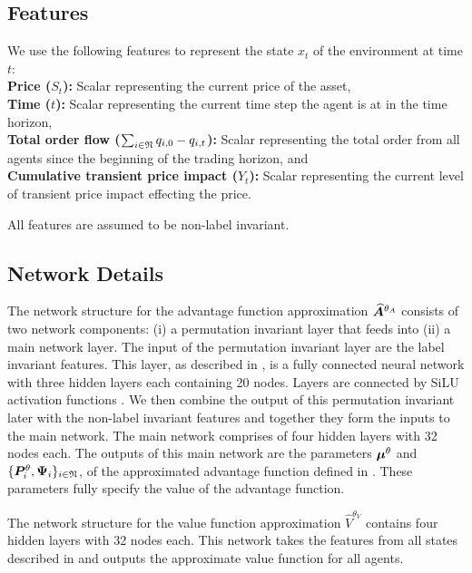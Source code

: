 \documentclass[onefignum,onetabnum]{siamonline171218}
\begin{document}
\subsection{Features}
\label{sec:features}
We use the following features to represent the state $x_t$ of the environment at time $t$:\\
\textbf{Price ($S_t$): } Scalar representing the current price of the asset, \\
\textbf{Time ($t$): } Scalar representing the current time step the agent is at in the time horizon, \\
\textbf{Total order flow ($\sum_{i \in {\mathfrak{N}}} q_{i,0} - q_{i,t} $): } Scalar representing the total order from all agents since the beginning of the trading horizon, and \\
\textbf{Cumulative transient price impact ($Y_t$): } Scalar representing the current level of transient price impact effecting the price.

All features are assumed to be non-label invariant. 

\subsection{Network Details}

The network structure for the advantage function approximation $\bm{\widehat{A}}^{\theta_A}$ consists of two network components: (i) a permutation invariant layer that feeds into (ii) a main network layer. The input of the permutation invariant layer are the label invariant features. This layer, as described in , is a fully connected neural network with three hidden layers each containing 20 nodes. Layers are connected by SiLU activation functions \cite{elfwing2018sigmoid}.  We then combine the output of this permutation invariant later with the non-label invariant features and together they form the inputs to the main network. The main network comprises of four hidden layers with 32 nodes each.  The outputs of this main network are the parameters $\bm{\mu}^{\theta}$ and $\{\bm{P}^\theta_{i}, \bm{\Psi}_i \}_{i\in{\mathfrak{N}}}$, of the approximated advantage function defined in . These parameters fully specify  the value of the advantage function. 

The network structure for the value function approximation  $\hat{V}^{\theta_V}$ contains four hidden layers with 32 nodes each. This network takes the features from all states described in  and outputs the approximate value function for all agents.
\end{document}
